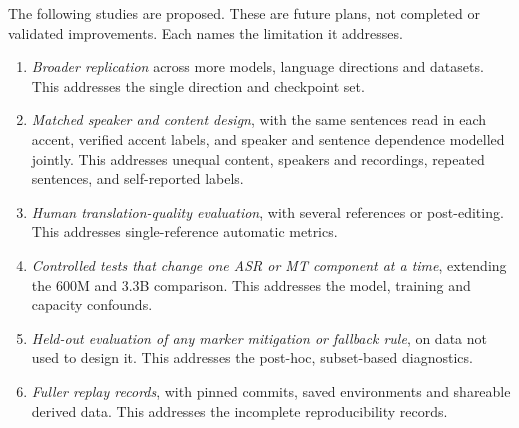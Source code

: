 The following studies are proposed. These are future plans, not completed
or validated improvements. Each names the limitation it addresses.
\begin{enumerate}
\item \emph{Broader replication} across more models, language directions
and datasets. This addresses the single direction and checkpoint set.

\item \emph{Matched speaker and content design}, with the same sentences
read in each accent, verified accent labels, and speaker and sentence
dependence modelled jointly. This addresses unequal content, speakers
and recordings, repeated sentences, and self-reported labels.

\item \emph{Human translation-quality evaluation}, with several
references or post-editing. This addresses single-reference automatic
metrics.

\item \emph{Controlled tests that change one ASR or MT component at a
time}, extending the 600M and 3.3B comparison. This addresses the
model, training and capacity confounds.

\item \emph{Held-out evaluation of any marker mitigation or fallback
rule}, on data not used to design it. This addresses the post-hoc,
subset-based diagnostics.

\item \emph{Fuller replay records}, with pinned commits, saved
environments and shareable derived data. This addresses the incomplete
reproducibility records.
\end{enumerate}
